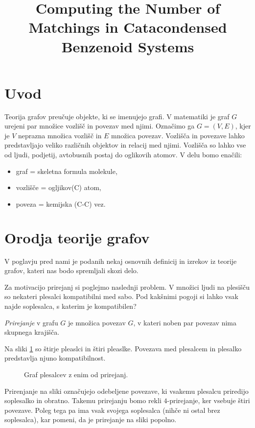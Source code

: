 \documentclass[mat1, tisk]{fmfdelo}
\title{Computing the Number of Matchings in
Catacondensed Benzenoid Systems}
\begin{document}
\section{Uvod}
Teorija grafov preučuje objekte, ki se imenujejo grafi.
V matematiki je graf $G$ urejeni par množice vozlišč in povezav med njimi. 
Označimo ga $G = (V,E)$, kjer je $V$ neprazna množica vozlišč in $E$ množica povezav.
Vozlišča in povezave lahko 
predstavljajo veliko različnih objektov in relacij med njimi.
Vozlišča so lahko vse od ljudi, podjetij, avtobusnih postaj 
do oglikovih atomov. V delu bomo enačili:

\begin{itemize}
  \item graf = skeletna formula molekule,
  \item vozlišče = ogljikov(C) atom,
  \item  poveza = kemijska (C-C) vez.
\end{itemize}













\section{Orodja teorije grafov}
V poglavju pred nami je podanih nekaj osnovnih definicij in izrekov iz teorije grafov,
kateri nas bodo spremljali skozi delo.


Za motivacijo prirejanj si poglejmo naslednji problem.
V množici ljudi na plesišču 
so nekateri plesalci kompatibilni med sabo. 
Pod kakšnimi pogoji si lahko vsak najde soplesalca, s katerim je kompatibilen? 

\begin{definicija}
  \emph{Prirejanje} v grafu $G$ je množica povezav $G$, v kateri noben par povezav nima skupnega krajišča.
\end{definicija}

\begin{zgled}

    Na sliki \ref{fig:plesisce} so štirje pleaslci in štiri pleaslke.
    Povezava med plesalcem in plesalko predstavlja njuno kompatibilnost.
    


\begin{figure} [H]
  \begin{center}

    
    \label{fig:plesisce}
    \caption{Graf plesalcev z enim od prirejanj.}
  \end{center}
\end{figure}

Prirenjanje na sliki označujejo odebeljene povezave, ki 
    vsakemu plesalcu priredijo soplesalko in obratno.
    Takemu prirejanju bomo rekli $4$-prirejanje, ker 
    vsebuje štiri povezave.
    Poleg tega pa ima vsak svojega soplesalca (nihče ni ostal brez soplesalca),
    kar pomeni, da je prirejanje na sliki popolno.
\end{zgled}
\end{document}
